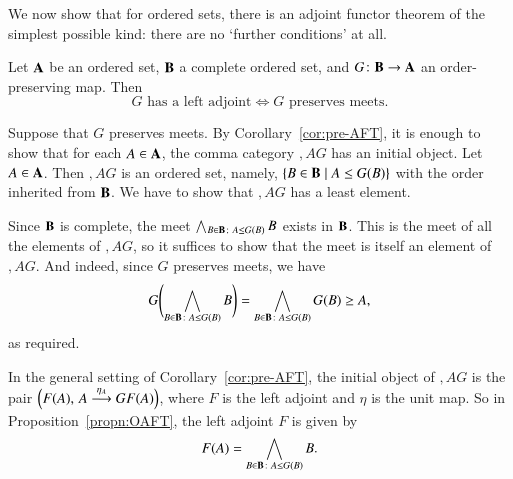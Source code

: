 We now show that for ordered sets, there is an adjoint functor theorem of the
simplest possible kind: there are no `further conditions' at all.

\begin{propn}
\label{propn:OAFT}
Let $\mathbf{A}$ be an ordered set, $\mathbf{B}$ a complete ordered set, and
$G\from \scat{B} \to \scat{A}$ an order-preserving map.  Then
\[
G \text{ has a left adjoint}
\iff
G \text{ preserves meets}.
\]
\end{propn}

\begin{pf}
Suppose that $G$ preserves meets.  By Corollary~\ref{cor:pre-AFT}, it is
enough to show that for each $A \in \mathbf{A}$, the comma category
$\comma{A}{G}$ has an initial object.  Let $A \in \mathbf{A}$.  Then
$\comma{A}{G}$ is an ordered set, namely, $\{ B \in \mathbf{B} \mathrel{|} A \leq
G(B) \}$ with the order inherited from $\mathbf{B}$.  We have to show that
$\comma{A}{G}$ has a least element.

Since $\mathbf{B}$ is complete, the meet $\Meet_{B \in \scat{B}\from A \leq
  G(B)} B$ exists in $\mathbf{B}$.  This is the meet of all the elements of
$\comma{A}{G}$, so it suffices to show that the meet is itself an element
of $\comma{A}{G}$.  And indeed, since $G$ preserves meets, we have
\[
G \Biggl( \Meet_{B \in \scat{B}\from A \leq G(B)} B \Biggr)
=
\Meet_{B \in \scat{B}\from A \leq G(B)} G(B)
\geq
A,
\]
as required.
\end{pf}

In the general setting of Corollary~\ref{cor:pre-AFT}, the initial object
of $\comma{A}{G}$ is the pair $\Bigl(F(A),\, A \stackrel{\eta_A}{\longrightarrow} GF(A)\Bigr)$,
where $F$ is the left adjoint and $\eta$ is the unit map.  So in
Proposition~\ref{propn:OAFT}, the left adjoint $F$ is given by
%
\begin{equation}
\label{eq:ladj-recipe}
F(A)
=
\Meet_{B \in \scat{B}\from A \leq G(B)} B.
\end{equation}

